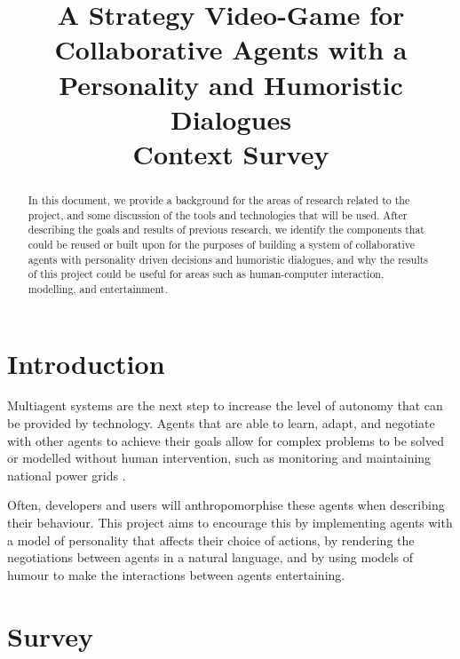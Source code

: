 \documentclass[conference]{IEEEtran}
\begin{document}
\title{A Strategy Video-Game for Collaborative Agents with a Personality and Humoristic Dialogues\\
{\large Context Survey}
}

\author{
\and
{}
\and
{}
}

\maketitle

\begin{abstract}

	In this document, we provide a background for the areas of research related to the project, and some discussion of the tools and technologies that will be used. After describing the goals and results of previous research, we identify the components that could be reused or built upon for the purposes of building a system of collaborative agents with personality driven decisions and humoristic dialogues, and why the results of this project could be useful for areas such as human-computer interaction, modelling, and entertainment. 

\end{abstract}

\section{Introduction}

Multiagent systems are the next step to increase the level of autonomy that can be provided by technology. Agents that are able to learn, adapt, and negotiate with other agents to achieve their goals allow for complex problems to be solved or modelled without human intervention, such as monitoring and maintaining national power grids \cite{archon}. 

Often, developers and users will anthropomorphise these agents when describing their behaviour. This project aims to encourage this by implementing agents with a model of personality that affects their choice of actions, by rendering the negotiations between agents in a natural language, and by using models of humour to make the interactions between agents entertaining. 

\section{Survey}
\end{document}
